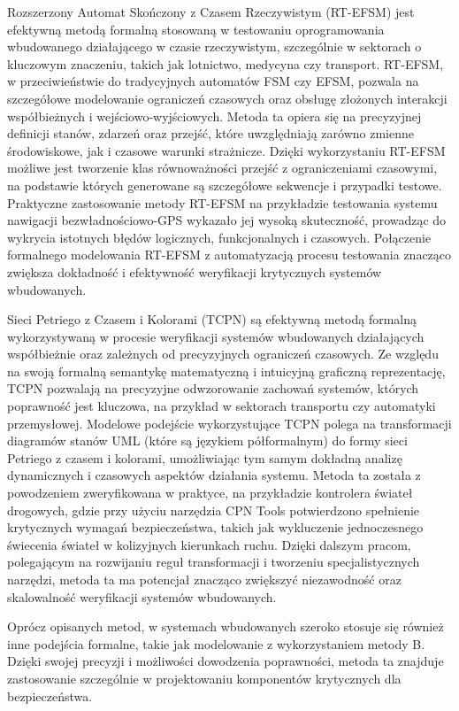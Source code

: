 \documentclass[conference]{IEEEtran}
\begin{document}
    Rozszerzony Automat Skończony z Czasem Rzeczywistym (RT-EFSM) jest efektywną metodą formalną stosowaną w testowaniu oprogramowania wbudowanego działającego w czasie rzeczywistym, szczególnie w sektorach o kluczowym znaczeniu, takich jak lotnictwo, medycyna czy transport.
    RT-EFSM, w przeciwieństwie do tradycyjnych automatów FSM czy EFSM, pozwala na szczegółowe modelowanie ograniczeń czasowych oraz obsługę złożonych interakcji współbieżnych i 
    wejściowo-wyjściowych. Metoda ta opiera się na precyzyjnej definicji stanów, zdarzeń oraz przejść, które uwzględniają zarówno zmienne środowiskowe, 
    jak i czasowe warunki strażnicze. Dzięki wykorzystaniu RT-EFSM możliwe jest tworzenie klas równoważności przejść z ograniczeniami czasowymi,
    na podstawie których generowane są szczegółowe sekwencje i przypadki testowe. Praktyczne zastosowanie metody RT-EFSM na przykładzie testowania systemu nawigacji bezwładnościowo-GPS wykazało jej wysoką skuteczność,
    prowadząc do wykrycia istotnych błędów logicznych, funkcjonalnych i czasowych. Połączenie formalnego modelowania RT-EFSM z automatyzacją procesu testowania znacząco zwiększa dokładność i efektywność weryfikacji krytycznych systemów wbudowanych.

    Sieci Petriego z Czasem i Kolorami (TCPN) są efektywną metodą formalną wykorzystywaną w procesie weryfikacji systemów wbudowanych działających współbieżnie oraz zależnych od precyzyjnych ograniczeń czasowych. Ze względu na swoją formalną semantykę matematyczną i intuicyjną graficzną reprezentację,
    TCPN pozwalają na precyzyjne odwzorowanie zachowań systemów, których poprawność jest kluczowa, na przykład w sektorach transportu czy automatyki przemysłowej. 
    Modelowe podejście wykorzystujące TCPN polega na transformacji diagramów stanów UML (które są językiem półformalnym) do formy sieci Petriego z czasem i kolorami, 
    umożliwiając tym samym dokładną analizę dynamicznych i czasowych aspektów działania systemu. Metoda ta została z powodzeniem zweryfikowana w praktyce,
    na przykładzie kontrolera świateł drogowych, gdzie przy użyciu narzędzia CPN Tools potwierdzono spełnienie krytycznych wymagań bezpieczeństwa, 
    takich jak wykluczenie jednoczesnego świecenia świateł w kolizyjnych kierunkach ruchu. Dzięki dalszym pracom, polegającym na rozwijaniu reguł transformacji i tworzeniu specjalistycznych narzędzi,
    metoda ta ma potencjał znacząco zwiększyć niezawodność oraz skalowalność weryfikacji systemów wbudowanych.

    Oprócz opisanych metod, w systemach wbudowanych szeroko stosuje się również inne podejścia formalne, takie jak modelowanie z wykorzystaniem metody B. Dzięki swojej precyzji i możliwości dowodzenia poprawności, 
    metoda ta znajduje zastosowanie szczególnie w projektowaniu komponentów krytycznych dla bezpieczeństwa.
\end{document}
